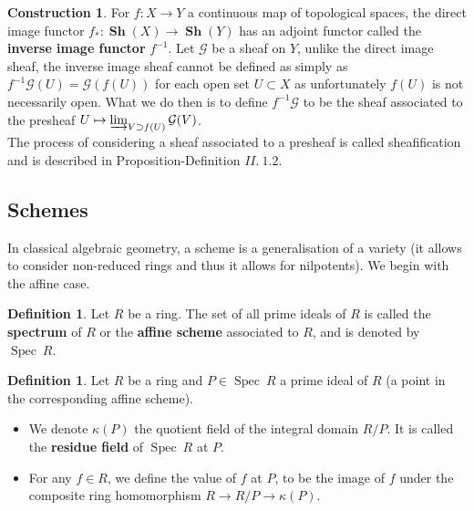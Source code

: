 \documentclass{article}
\theoremstyle{plain}
\theoremstyle{definition}
\newtheorem{definition}[theorem]{Definition}
\newtheorem{construction}[theorem]{Construction}
\DeclareMathOperator{\Spec}{Spec}
\DeclareMathOperator{\Sh}{\textbf{Sh}}
\begin{document}
\begin{construction}
\label{almost_pullback_sheaf}
    For $f: X\rightarrow Y$ a continuous map of topological spaces, the direct image functor $f_* : \Sh(X) \rightarrow \Sh(Y)$ has an adjoint functor called the \textbf{inverse image functor} $f^{-1}$. 
    Let $\mathcal{G}$ be a sheaf on $Y$,
    unlike the direct image sheaf, the inverse image sheaf cannot be defined as simply as $f^{-1}\mathcal{G}(U) = \mathcal{G}(f(U))$ for each open set $U\subset X$ as unfortunately $f(U)$ is not necessarily open.
    What we do then is to define $f^{-1}\mathcal{G}$ to be the sheaf associated to the presheaf $U\mapsto \varinjlim_{V\supset f(U)} \mathcal{G}(V)$.\\
    The process of considering a sheaf associated to a presheaf is called sheafification and is described in \cite{Hartshorne} Proposition-Definition $II.\:1.2$.\\
\end{construction}





\subsection{Schemes}
\label{Annexe_scheme}

In classical algebraic geometry, a scheme is a generalisation of a variety (it allows to consider non-reduced rings and thus it allows for nilpotents).
We begin with the affine case.

\begin{definition}
    Let $R$ be a ring. The set of all prime ideals of $R$ is called the \textbf{spectrum} of $R$ or the \textbf{affine scheme} associated to $R$, and is denoted by $\Spec\:R$.
\end{definition}

\begin{definition}
    Let $R$ be a ring and $P\in\Spec\:R$ a prime ideal of $R$ (a point in the corresponding affine scheme).
    \begin{itemize}
        \item[$a)$] We denote $\kappa(P)$ the quotient field of the integral domain $R/P$. It is called the \textbf{residue field} of $\Spec\:R$ at $P$.
        \item[$b)$] For any $f\in R$, we define the value of $f$ at $P$, to be the image of $f$ under the composite ring homomorphism $R\rightarrow R/P\rightarrow \kappa(P)$.
    \end{itemize}
\end{definition}
\end{document}
